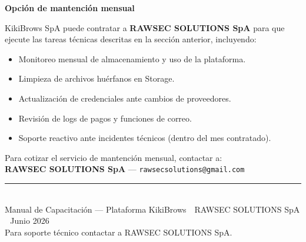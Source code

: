 \documentclass[a4paper,11pt]{article}
\begin{document}
\begin{infobox}
\textbf{Opci\'on de mantenci\'on mensual}

KikiBrows SpA puede contratar a \textbf{RAWSEC SOLUTIONS SpA} para que ejecute
las tareas t\'ecnicas descritas en la secci\'on anterior, incluyendo:

\begin{itemize}
  \item Monitoreo mensual de almacenamiento y uso de la plataforma.
  \item Limpieza de archivos hu\'erfanos en Storage.
  \item Actualizaci\'on de credenciales ante cambios de proveedores.
  \item Revisi\'on de logs de pagos y funciones de correo.
  \item Soporte reactivo ante incidentes t\'ecnicos (dentro del mes contratado).
\end{itemize}

Para cotizar el servicio de mantenci\'on mensual, contactar a:\\
\textbf{RAWSEC SOLUTIONS SpA} --- \texttt{rawsecsolutions@gmail.com}
\end{infobox}

\vspace{10mm}
\begin{center}
  {\color{bordergray}\rule{\linewidth}{0.3pt}}\\[6pt]
  {\small\color{midgray}
    Manual de Capacitaci\'on --- Plataforma KikiBrows \,\textperiodcentered\,
    RAWSEC SOLUTIONS SpA \,\textperiodcentered\, Junio 2026\\
    Para soporte t\'ecnico contactar a RAWSEC SOLUTIONS SpA.}
\end{center}
\end{document}
